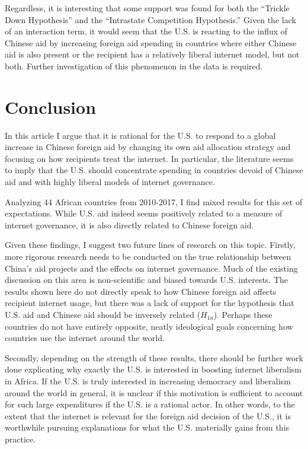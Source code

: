 \documentclass[12pt]{article}
\begin{document}
Regardless, it is interesting that some support was found for both the ``Trickle Down Hypothesis'' and the ``Intrastate Competition Hypothesis.'' Given the lack of an interaction term, it would seem that the U.S. is reacting to the influx of Chinese aid by increasing foreign aid spending in countries where either Chinese aid is also present or the recipient has a relatively liberal internet model, but not both. Further investigation of this phenomenon in the data is required.

\section*{Conclusion}
In this article I argue that it is rational for the U.S. to respond to a global increase in Chinese foreign aid by changing its own aid allocation strategy and focusing on how recipients treat the internet. In particular, the literature seems to imply that the U.S. should concentrate spending in countries devoid of Chinese aid and with highly liberal models of internet governance.

Analyzing 44 African countries from 2010-2017, I find mixed results for this set of expectations. While U.S. aid indeed seems positively related to a measure of internet governance, it is also directly related to Chinese foreign aid.

Given these findings, I suggest two future lines of research on this topic. Firstly, more rigorous research needs to be conducted on the true relationship between China's aid projects and the effects on internet governance. Much of the existing discussion on this area is non-scientific and biased towards U.S. interests. The results shown here do not directly speak to how Chinese foreign aid affects recipient internet usage, but there was a lack of support for the hypothesis that U.S. aid and Chinese aid should be inversely related ($H_{1a}$). Perhaps these countries do not have entirely opposite, neatly ideological goals concerning how countries use the internet around the world.

Secondly, depending on the strength of these results, there should be further work done explicating why exactly the U.S. is interested in boosting internet liberalism in Africa. If the U.S. is truly interested in increasing democracy and liberalism around the world in general, it is unclear if this motivation is sufficient to account for such large expenditures if the U.S. is a rational actor. In other words, to the extent that the internet is relevant for the foreign aid decision of the U.S., it is worthwhile pursuing explanations for what the U.S. materially gains from this practice.
\end{document}
